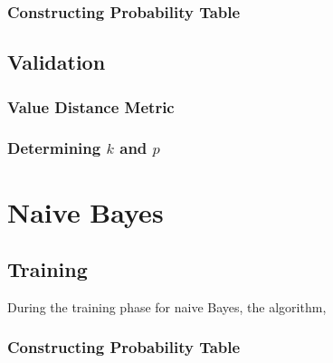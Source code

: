 \documentclass{article}
\begin{document}
		\subsubsection{Constructing Probability Table}
	\subsection{Validation}
		\subsubsection{Value Distance Metric}
		\subsubsection{Determining $k$ and $p$}
\section{Naive Bayes}
	\subsection{Training}
	
		During the training phase for naive Bayes, the algorithm,
	
		\subsubsection{Constructing Probability Table}
		
\end{document}
